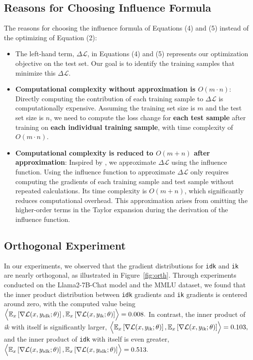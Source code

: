 \subsection{Reasons for Choosing Influence Formula}
\label{app:Reasons for Choosing Influence Formula}
The reasons for choosing the influence formula of Equations (4) and (5) instead of the optimizing of Equation (2):
\begin{itemize}[leftmargin=*]
    \item The left-hand term, $\Delta \mathcal{L}$, in Equations (4) and (5) represents our optimization objective on the test set. Our goal is to identify the training samples that minimize this $\Delta \mathcal{L}$.
    \item \textbf{Computational complexity without approximation is $O(m \cdot n)$}: Directly computing the contribution of each training sample to $\Delta \mathcal{L}$ is computationally expensive. Assuming the training set size is $m$ and the test set size is $n$, we need to compute the loss change for \textbf{each test sample} after training on \textbf{each individual training sample}, with time complexity of $O(m \cdot n)$.
    \item \textbf{Computational complexity is reduced to $O(m + n)$ after approximation}: Inspired by \cite{Pruthi_Liu_Kale_Sundararajan_2020, Xia_Malladi_Gururangan_Arora_Chen}, we approximate $\Delta \mathcal{L}$ using the influence function. Using the influence function to approximate $\Delta \mathcal{L}$ only requires computing the gradients of each training sample and test sample without repeated calculations. Its time complexity is $O(m + n)$, which significantly reduces computational overhead. This approximation arises from omitting the higher-order terms in the Taylor expansion during the derivation of the influence function. 
\end{itemize}


\subsection{Orthogonal Experiment}
\label{subsec:orthogonal_experiment}
In our experiments, we observed that the gradient distributions for \texttt{idk} and \texttt{ik} are nearly orthogonal, as illustrated in Figure~\ref{fig:orth}. Through experiments conducted on the Llama2-7B-Chat model and the MMLU dataset, we found that the inner product distribution between \texttt{idk} gradients and \texttt{ik} gradients is centered around zero, with the computed value being
$
\Bigl \langle \mathbb{E}_{x } \left[ \nabla \mathcal{L}(x,y_{\text{idk}}; \theta) \right], 
\mathbb{E}_{x} \left[ \nabla \mathcal{L}(x,y_{\text{ik}}; \theta) \right] \Bigr \rangle = 0.008.
$
In contrast, the inner product of \textit{ik} with itself is significantly larger,
$
\Bigl \langle \mathbb{E}_{x } \left[ \nabla \mathcal{L}(x,y_{\text{ik}}; \theta) \right], 
\mathbb{E}_{x} \left[ \nabla \mathcal{L}(x,y_{\text{ik}}; \theta) \right] \Bigr \rangle = 0.103,
$
and the inner product of \texttt{idk} with itself is even greater,
$
\Bigl \langle \mathbb{E}_{x } \left[ \nabla \mathcal{L}(x,y_{\text{idk}}; \theta) \right], 
\mathbb{E}_{x} \left[ \nabla \mathcal{L}(x,y_{\text{idk}}; \theta) \right] \Bigr \rangle = 0.513.
$

